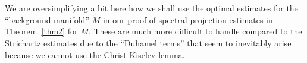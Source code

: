 \documentclass[10pt]{amsart}
\newcommand{\la}{\lambda}
\newcommand{\1}{{\bf 1}}
\newcommand{\R}{{\mathbb R}}
\begin{document}
We are oversimplifying a bit here how we shall use the optimal estimates for the ``background manifold''
$\tilde M$
in our proof of spectral projection estimates in Theorem~\ref{thm2} for $M$.   These are much more difficult to handle
compared to the Strichartz estimates due to the ``Duhamel terms'' that seem to inevitably arise because we cannot use
the Christ-Kiselev lemma.


%
\end{document}
